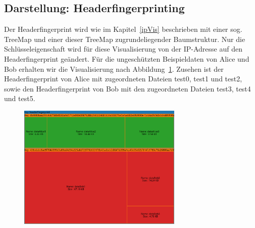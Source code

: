 \documentclass[
    fontsize=12pt,
    headings=small,
    parskip=half,           %
    bibliography=totoc,
    numbers=noenddot,       %
    open=any,               %
    ]{scrreprt}
\begin{document}

\newpage
    \subsection{Darstellung: Headerfingerprinting}
Der Headerfingerprint wird wie im Kapitel~\ref{ipVis} beschrieben mit einer sog. TreeMap und einer dieser TreeMap zugrundeliegender Baumstruktur.
Nur die Schlüsseleigenschaft wird für diese Visualisierung von der IP-Adresse auf den Headerfingerprint geändert.
Für die ungeschützten Beispieldaten von Alice und Bob erhalten wir die Visualisierung nach Abbildung~\ref{fig:ungHTM}.
Zusehen ist der Headerfingerprint von Alice mit zugeordneten Dateien test0, test1 und test2, sowie den Headerfingerprint von Bob mit den zugeordneten Dateien test3, test4 und test5.

\begin{figure}[H]
\includegraphics[width=0.7\textwidth]{../pic/Header-Proxy-SetA.PNG}
\label{fig:ungHTM}
\end{figure}
\end{document}

